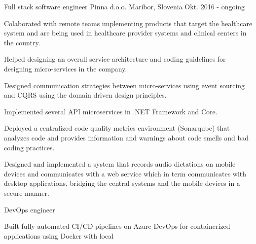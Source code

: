 

\begin{cventries}

  \cventry
    {Full stack software engineer} %
    {Pinna d.o.o.} %
    {Maribor, Slovenia} %
    {Okt. 2016 - ongoing} %
    {
      \begin{cvitems} %
        \item {Colaborated with remote teams implementing products that 
        target the healthcare system and are being used in healthcare
         provider systems and clinical centers in the country.}
        \item {Helped designing an overall service architecture 
        and coding guidelines for designing micro-services in the company.}
        \item {Designed communication strategies between micro-services 
        using event sourcing and CQRS using the domain driven design principles.}
        \item {Implemented several API microservices in .NET Framework and Core.}
        \item {Deployed a centralized code quality metrics environment 
        (Sonarqube) that analyzes code and provides information and 
        warnings about code smells and bad coding practices.}
        \item {Designed and implemented a system that records audio 
        dictations on mobile devices and communicates with a web 
        service which in term communicates with desktop applications,
         bridging the central systems and the mobile devices in a secure manner.}
      \end{cvitems}
    }
    \cventry
    {DevOps engineer} %
    {} %
    {} %
    {} %
    {
      \begin{cvitems} %
        \item {Built fully automated CI/CD pipelines on Azure
         DevOps for containerized applications using Docker with local 
}
\end{cvitems}}
\end{cventries}
